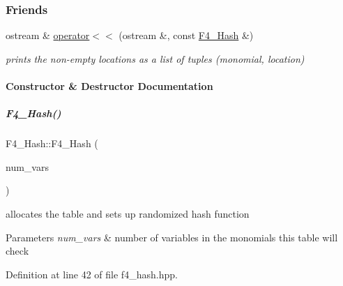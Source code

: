 \subsubsection*{Friends}
\begin{DoxyCompactItemize}
\item 
\mbox{\label{group___g_b_computation_a979748da85dd3012fb925b0ff6b9b71c}} 
ostream \& \hyperlink{group___g_b_computation_a979748da85dd3012fb925b0ff6b9b71c}{operator$<$$<$} (ostream \&, const \hyperlink{group___g_b_computation_class_f4___hash}{F4\+\_\+\+Hash} \&)
\begin{DoxyCompactList}\small\item\em prints the non-\/empty locations as a list of tuples (monomial, location) \end{DoxyCompactList}\end{DoxyCompactItemize}


\paragraph{Constructor \& Destructor Documentation}
\mbox{\label{group___g_b_computation_a3983b59e08fa7ad90bba989850f9850f}} 
\subparagraph{\texorpdfstring{F4\+\_\+\+Hash()}{F4\_Hash()}}
{\footnotesize\ttfamily F4\+\_\+\+Hash\+::\+F4\+\_\+\+Hash (\begin{DoxyParamCaption}\item[{N\+V\+A\+R\+\_\+\+T\+Y\+PE}]{num\+\_\+vars }\end{DoxyParamCaption})\hspace{0.3cm}{\ttfamily [inline]}}



allocates the table and sets up randomized hash function 


\begin{DoxyParams}{Parameters}
{\em num\+\_\+vars} & number of variables in the monomials this table will check \\
\hline
\end{DoxyParams}


Definition at line 42 of file f4\+\_\+hash.\+hpp.



